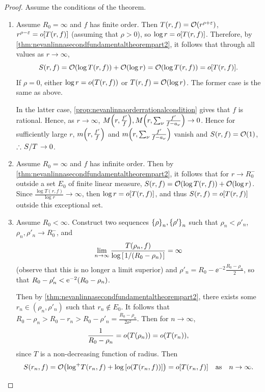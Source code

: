 \begin{proof}
    Assume the conditions of the theorem.
    \begin{enumerate}
        \item Assume \(R_0=\infty\) and \(f\) has finite order. Then \(T(r,f)=\order{r^{\rho+\varepsilon}}\), \(r^{\rho-\varepsilon}=o\qty[T(r,f)]\) (assuming that \(\rho>0\)), so \(\log r=o\qty[T(r,f)]\). Therefore, by \cref{thm:nevanlinnasecondfundamentaltheorempart2}, it follows that through all values as \(r\to\infty\),
            \[S(r,f)=\order{\log T(r,f)}+\order{\log r}=\order{\log T(r,f)}=o\qty[T(r,f)].\]
            If \(\rho=0\), either \(\log r=o\qty(T(r,f))\) or \(T\qty(r,f)=\order{\log r}\). The former case is the same as above.

            In the latter case, \cref{prop:nevanlinnaorderrationalcondition} gives that \(f\) is rational. Hence, as \(r\to\infty\), \(M\qty(r,\tfrac{f'}{f}),M\qty(r,\sum_\nu\tfrac{f'}{f-a_\nu})\to 0\). Hence for sufficiently large \(r\), \(m\qty(r,\tfrac{f'}f)\) and \(m\qty(r,\sum_\nu\tfrac{f'}{f-a_\nu})\) vanish and \(S(r,f)=\order{1}\), \(\therefore\flatfrac{S}{T}\to 0\).
        \item Assume \(R_0=\infty\) and \(f\) has infinite order. Then by \cref{thm:nevanlinnasecondfundamentaltheorempart2}, it follows that for \(r\to R_0^-\) outside a set \(E_0\) of finite linear measure, \(S(r,f)=\order{\log T(r,f)}+\order{\log r}\). Since \(\tfrac{\log T(r,f)}{\log r}\to\infty\), then \(\log r=o\qty[T(r,f)]\), and thus \(S(r,f)=o\qty[T(r,f)]\) outside this exceptional set.
        \item Assume \(R_0<\infty\). Construct two sequences \(\qty{\rho}_n,\qty{\rho'}_n\) such that \(\rho_n<\rho'_n\), \(\rho_n,\rho'_n\to R_0^-\), and \[\lim_{n\to\infty}\frac{T\qty(\rho_n,f)}{\log\qty[\flatfrac1{\qty(R_0-\rho_n)}]}=\infty\] (observe that this is no longer a limit superior) and \(\rho'_n=R_0-\ee^{-2}\tfrac{R_0-\rho_n}2\), so that \(R_0-\rho'_n<\mathrm{e}^{-2}\qty(R_0-\rho_n)\).

            Then by \cref{thm:nevanlinnasecondfundamentaltheorempart2}, there exists some \(r_n\in(\rho_n,\rho'_n)\) such that \(r_n\notin E_0\). It follows that \(R_0-\rho_n>R_0-r_n>R_0-\rho'_n=\tfrac{R_0-\rho_n}{2\ee^2}\). Then for \(n\to\infty\), \[\frac1{R_0-\rho_n}=o\qty(T\qty(\rho_n))=o\qty(T\qty(r_n)),\] since \(T\) is a non-decreasing function of radius. Then \[S\qty(r_n,f)=\order{\logp T(r_n,f)+\log\qty[o\qty(T\qty(r_n,f))]}=o\qty[T(r_n,f)]\qq{as}n\to\infty.\qedhere\]
    \end{enumerate}
\end{proof}
